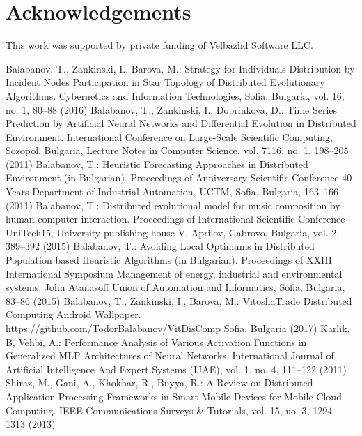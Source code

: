 \documentclass{llncs}
\begin{document}
\section*{Acknowledgements}
%
This work was supported by private funding of Velbazhd Software LLC.
%
%
\begin{thebibliography}{}
%
Balabanov, T., Zankinski, I., Barova, M.:
Strategy for Individuals Distribution by Incident Nodes Participation in Star Topology of Distributed Evolutionary Algorithms.
Cybernetics and Information Technologies, Sofia, Bulgaria, vol. 16, no. 1, 80--88  (2016)
%
Balabanov, T., Zankinski, I., Dobrinkova, D.:
Time Series Prediction by Artificial Neural Networks and Differential Evolution in Distributed Environment.
International Conference on Large-Scale Scientific Computing, Sozopol, Bulgaria, Lecture Notes in Computer Science, vol. 7116, no. 1, 198--205  (2011)
%
Balabanov, T.:
Heuristic Forecasting Approaches in Distributed Environment (in Bulgarian).
Proceedings of Anniversary Scientific Conference 40 Years Department of Industrial Automation, UCTM, Sofia, Bulgaria, 163--166 (2011)
%
Balabanov, T.:
Distributed evolutional model for music composition by human-computer interaction.
Proceedings of International Scientific Conference UniTech15, University publishing house V. Aprilov, Gabrovo, Bulgaria, vol. 2, 389--392 (2015)
%
Balabanov, T.:
Avoiding Local Optimums in Distributed Population based Heuristic Algorithms (in Bulgarian).
Proceedings of XXIII International Symposium Management of energy, industrial and environmental systems, John Atanasoff Union of Automation and Informatics, Sofia, Bulgaria, 83--86 (2015)
%
Balabanov, T., Zankinski, I., Barova, M.:
VitoshaTrade Distributed Computing Android Wallpaper.
https://github.com/TodorBalabanov/VitDisComp Sofia, Bulgaria  (2017)
%
Karlik, B, Vehbi, A.:
Performance Analysis of Various Activation Functions in Generalized MLP Architectures of Neural Networks.
International Journal of Artificial Intelligence And Expert Systems (IJAE), vol. 1, no. 4, 111--122 (2011) 
%
Shiraz, M., Gani, A., Khokhar, R., Buyya, R.:
A Review on Distributed Application Processing Frameworks in Smart Mobile Devices for Mobile Cloud Computing.
IEEE Communications Surveys \& Tutorials, vol. 15, no. 3, 1294--1313 (2013) 
%
\end{thebibliography}
\end{document}
